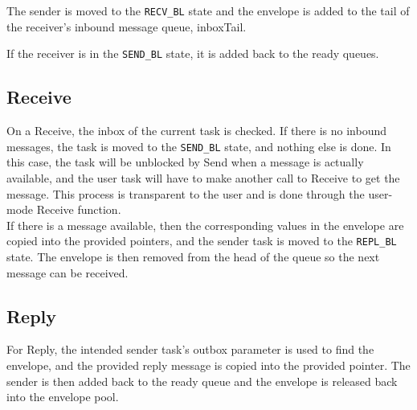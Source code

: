 \documentclass[12pt]{article}
\begin{document}
The sender is moved to the \texttt{RECV\_BL} state and the envelope is added to the tail of the receiver's inbound message queue, inboxTail.

If the receiver is in the \texttt{SEND\_BL} state, it is added back to the ready queues.
\subsection{Receive}
On a Receive, the inbox of the current task is checked. If there is no inbound messages, the task is moved to the \texttt{SEND\_BL} state, and nothing else is done. In this case, the task will be unblocked by Send when a message is actually available, and the user task will have to make another call to Receive to get the message. This process is transparent to the user and is done through the user-mode Receive function.
\\
If there is a message available, then the corresponding values in the envelope are copied into the provided pointers, and the sender task is moved to the \texttt{REPL\_BL} state. The envelope is then removed from the head of the queue so the next message can be received.
\subsection{Reply}
For Reply, the intended sender task's outbox parameter is used to find the envelope, and the provided reply message is copied into the provided pointer. The sender is then added back to the ready queue and the envelope is released back into the envelope pool.
\end{document}
